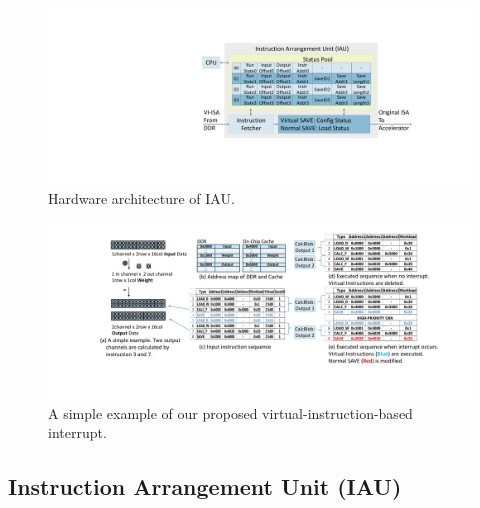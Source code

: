 \begin{figure}[t]
	\centering
	\includegraphics[width=0.99\linewidth]{fig/iau.pdf}
	\caption{Hardware architecture of IAU. 
	}
	\label{fig:IAU}
\end{figure}
\begin{figure}[t]
	\centering
	\includegraphics[width=0.99\linewidth]{fig/interexample.pdf}
	\caption{ A simple example of our proposed virtual-instruction-based interrupt. }
	\label{fig:interexample}
\end{figure}


\subsection{ Instruction Arrangement Unit (IAU) }


